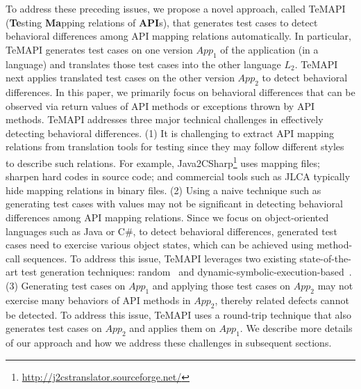 %

To address these preceding issues, we propose a novel approach, called TeMAPI (\textbf{Te}sting \textbf{Ma}pping relations of \textbf{API}s), that generates test cases to detect behavioral differences among API mapping relations automatically. In particular, TeMAPI generates test cases on one version $App_1$ of the application (in a language) and translates those test cases into the other language $L_2$. TeMAPI next applies translated test cases on the other version $App_2$ to detect behavioral differences. In this paper, we primarily focus on behavioral differences that can be observed via return values of API methods or exceptions thrown by API methods. TeMAPI addresses three major technical challenges in effectively detecting behavioral differences. (1) It is challenging to extract API mapping relations from translation tools for testing since they may follow different styles to describe such relations. For example, Java2CSharp\footnote{\url{http://j2cstranslator.sourceforge.net/}} uses mapping files; sharpen hard codes in source code; and commercial tools such as JLCA typically hide mapping relations in binary files. (2) Using a naive technique such as generating test cases with  values may not be significant in detecting behavioral differences among API mapping relations. Since we focus on object-oriented languages such as Java or C\#, to detect behavioral differences, generated test cases need to exercise various object states, which can be achieved using method-call sequences. To address this issue, TeMAPI leverages two existing state-of-the-art test generation techniques: random~\cite{pacheco2007feedback} and dynamic-symbolic-execution-based~\cite{koushik:cute, godefroid:dart, tillmann2008pex}. (3) Generating test cases on $App_1$ and applying those test cases on $App_2$ may not exercise many behaviors of API methods in $App_2$, thereby related defects cannot be detected. To address this issue, TeMAPI uses a round-trip technique that also generates test cases on $App_2$ and applies them on $App_1$. We describe more details of our approach and how we address these challenges in subsequent sections.

